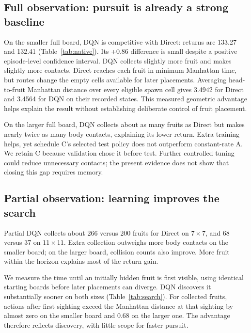 \documentclass{article}
\begin{document}
\subsection{Full observation: pursuit is already a strong baseline}
On the smaller full board, DQN is competitive with Direct: returns are 133.27 and 132.41 (Table~\ref{tab:native}). Its +0.86 difference is small despite a positive episode-level confidence interval. DQN collects slightly more fruit and makes slightly more contacts. Direct reaches each fruit in minimum Manhattan time, but routes change the empty cells available for later placements. Averaging head-to-fruit Manhattan distance over every eligible spawn cell gives 3.4942 for Direct and 3.4564 for DQN on their recorded states. This measured geometric advantage helps explain the result without establishing deliberate control of fruit placement.

On the larger full board, DQN collects about as many fruits as Direct but makes nearly twice as many body contacts, explaining its lower return. Extra training helps, yet schedule C's selected test policy does not outperform constant-rate A. We retain C because validation chose it before test. Further controlled tuning could reduce unnecessary contacts; the present evidence does not show that closing this gap requires memory.



\subsection{Partial observation: learning improves the search}
Partial DQN collects about 266 versus 200 fruits for Direct on $7\times7$, and 68 versus 37 on $11\times11$. Extra collection outweighs more body contacts on the smaller board; on the larger board, collision counts also improve. More fruit within the horizon explains most of the return gain.

\begin{samepage}
We measure the time until an initially hidden fruit is first visible, using identical starting boards before later placements can diverge. DQN discovers it substantially sooner on both sizes (Table~\ref{tab:search}). For collected fruits, actions after first sighting exceed the Manhattan distance at that sighting by almost zero on the smaller board and 0.68 on the larger one. The advantage therefore reflects discovery, with little scope for faster pursuit.\par
\end{samepage}
\end{document}
